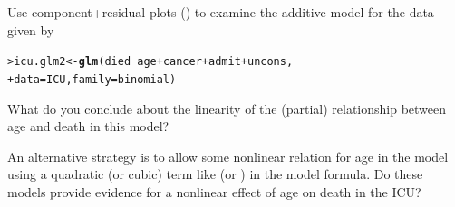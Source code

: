 \documentclass[10pt]{report}\usepackage[]{graphicx}\usepackage[]{color}
\makeatletter
\newcommand{\hlopt}[1]{\textcolor[rgb]{0,0,0}{#1}}%
\newcommand{\hlstd}[1]{\textcolor[rgb]{0.345,0.345,0.345}{#1}}%
\newcommand{\hlkwb}[1]{\textcolor[rgb]{0.69,0.353,0.396}{#1}}%
\newcommand{\hlkwc}[1]{\textcolor[rgb]{0.333,0.667,0.333}{#1}}%
\newcommand{\hlkwd}[1]{\textcolor[rgb]{0.737,0.353,0.396}{\textbf{#1}}}%
\newenvironment{kframe}{%
 \def\at@end@of@kframe{}%
 \ifinner\ifhmode%
  \def\at@end@of@kframe{\end{minipage}}%
  \begin{minipage}{\columnwidth}%
 \fi\fi%
 \def\FrameCommand##1{\hskip\@totalleftmargin \hskip-\fboxsep
 \colorbox{shadecolor}{##1}\hskip-\fboxsep
     \hskip-\linewidth \hskip-\@totalleftmargin \hskip\columnwidth}%
 \MakeFramed {\advance\hsize-\width
   \@totalleftmargin\z@ \linewidth\hsize
   \@setminipage}}%
 {\par\unskip\endMakeFramed%
 \at@end@of@kframe}
\newenvironment{knitrout}{}{} %
\renewenvironment{knitrout}{\small\renewcommand{\baselinestretch}{.85}}{} %
\makeatother
\begin{document}
\begin{Exercises}
\begin{enumerate*}
\begin{ans}
\begin{knitrout}
\end{knitrout}
    \end{ans}
    
  \end{enumerate*}

\exercise Use component+residual plots () to examine the additive model for the  data
given by
\begin{knitrout}\footnotesize
{}\color{fgcolor}\begin{kframe}
\begin{alltt}
\hlstd{> }\hlstd{icu.glm2} \hlkwb{<-} \hlkwd{glm}\hlstd{(died} \hlopt{~} \hlstd{age} \hlopt{+} \hlstd{cancer}  \hlopt{+} \hlstd{admit} \hlopt{+} \hlstd{uncons,}
\hlstd{+ }                \hlkwc{data}\hlstd{=ICU,} \hlkwc{family}\hlstd{=binomial)}
\end{alltt}
\end{kframe}
\end{knitrout}
  \begin{enumerate*} 
    \item What do you conclude about the linearity of the 
    (partial) relationship between age and death in this model?
    \begin{ans}
    \end{ans}
    
    \item An alternative strategy is to allow some nonlinear relation for
    age in the model using a quadratic (or cubic) term like  
    (or ) in the
    model formula. Do these models provide evidence for a nonlinear effect of age
    on death in the ICU?
    \begin{ans}
    \end{ans}
    
  \end{enumerate*}
  


\end{Exercises}
\end{document}
